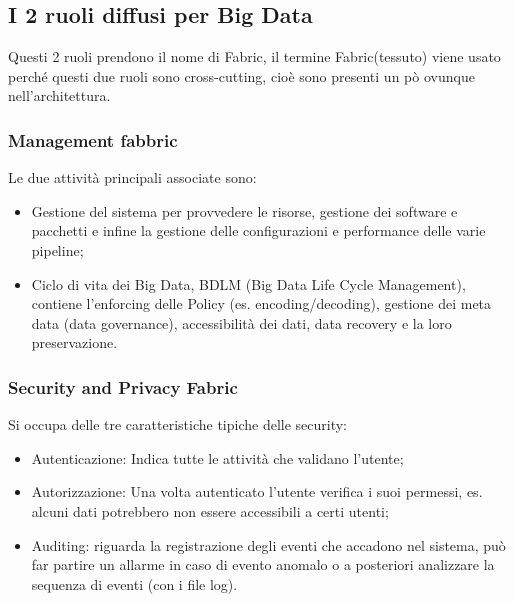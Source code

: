 \documentclass[11pt, twocolumn]{article}
\newenvironment{myitemize}
{ \begin{itemize}[topsep=0ex]
		\setlength{\itemsep}{0pt}
		\setlength{\parskip}{0pt}
		\setlength{\parsep}{0pt}     }
	{ \end{itemize}                  }
\begin{document}
\subsection{I 2 ruoli diffusi per Big Data}
Questi 2 ruoli prendono il nome di Fabric, il termine Fabric(tessuto) viene usato perché questi due ruoli sono cross-cutting, cioè sono presenti un pò ovunque nell'architettura.

\subsubsection{Management fabbric}
Le due attività principali associate sono:
\begin{myitemize}
	\item Gestione del sistema per provvedere le risorse, gestione dei software e pacchetti e infine la gestione delle configurazioni e performance delle varie pipeline;
	\item Ciclo di vita dei Big Data, BDLM (Big Data Life Cycle Management), contiene l'enforcing delle Policy (es. encoding/decoding), gestione dei meta data (data governance), accessibilità dei dati, data recovery e la loro preservazione.
\end{myitemize}


\subsubsection{Security and Privacy Fabric}
Si occupa delle tre caratteristiche tipiche delle security: 
\begin{myitemize}
	\item Autenticazione: Indica tutte le attività che validano l'utente;
	\item Autorizzazione: Una volta autenticato l'utente verifica i suoi permessi, es. alcuni dati potrebbero non essere accessibili a certi utenti;
	\item Auditing: riguarda la registrazione degli eventi che accadono nel sistema, può far partire un allarme in caso di evento anomalo o a posteriori analizzare la sequenza di eventi (con i file log).
\end{myitemize}
\end{document}
